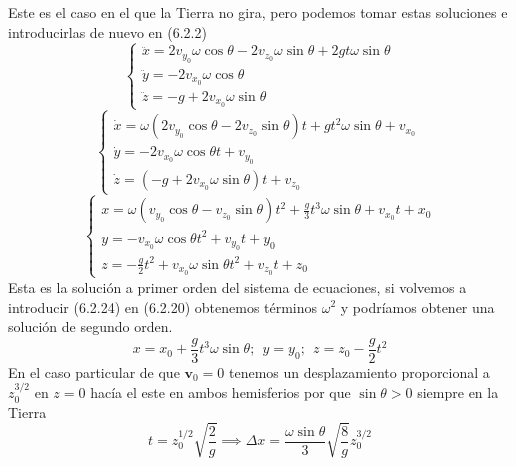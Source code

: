 Este es el caso en el que la Tierra no gira, pero podemos tomar estas soluciones e introducirlas de nuevo en (6.2.2)
\begin{equation} \label{6.1.1}
    \left\{\begin{matrix}
      \ddot{x} = 2 v_{y_0} \omega\cos\theta -2 v_{z_0}\omega\sin\theta + 2 gt \omega\sin\theta\\
      \ddot{y} = -2 v_{x_0} \omega \cos\theta \phantom{----------,,}\\
      \ddot{z} = -g +2 v_{x_0} \omega \sin\theta \phantom{---------}
    \end{matrix}\right. 
\end{equation} 
\begin{equation} \label{6.1.1}
    \left\{\begin{matrix}
      \dot{x} = \omega\left(2 v_{y_0} \cos\theta -2 v_{z_0}\sin\theta\right)t +  gt^2 \omega\sin\theta + v_{x_0}\\
      \dot{y} = -2 v_{x_0} \omega \cos\theta t + v_{y_0} \phantom{-----------,}\\
      \dot{z} = \left(-g +2 v_{x_0} \omega \sin\theta\right)t + v_{z_0} \phantom{--------,,}
    \end{matrix}\right. 
\end{equation} 
\begin{equation} \label{6.1.1}
    \left\{\begin{matrix}
        x = \omega\left( v_{y_0} \cos\theta - v_{z_0}\sin\theta\right)t^2 +  \frac{g}{3}t^3 \omega\sin\theta + v_{x_0}t + x_0\\
        y = -v_{x_0} \omega \cos\theta t^2 + v_{y_0}t + y_0 \phantom{-----------}\\
        z = -\frac{g}{2}t^2 + v_{x_0} \omega \sin\theta t^2 + v_{z_0}t+z_0 \phantom{--------,,}
    \end{matrix}\right. 
\end{equation} 
Esta es la solución a primer orden del sistema de ecuaciones, si volvemos a introducir (6.2.24) en (6.2.20) obtenemos términos $\omega^2$ y podríamos obtener una solución de segundo orden.
\begin{equation} \label{6.1.1}
    x =  x_0 + \frac{g}{3}t^3 \omega\sin\theta; \ \ y = y_0; \ \ z =z_0-\frac{g}{2}t^2 
\end{equation} 
En el caso particular de que $\mathbf{v}_0 = 0$ tenemos un desplazamiento proporcional a $z_0^{3/2}$ en $z=0$ hacía el este en ambos hemisferios por que $\sin\theta >0$ siempre en la Tierra 
\begin{equation} \label{6.1.1}
    t = z_0^{1/2} \sqrt{\frac{2}{g}} \implies \Delta x = \frac{ \omega \sin\theta}{3} \sqrt{\frac{8}{g}} z_0^{3/2}
\end{equation} 
\vspace{-15}
